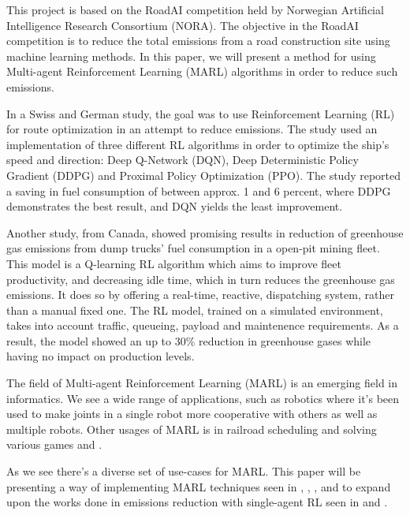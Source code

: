 \documentclass[conference]{IEEEtran}
\begin{document}
	This project is based on the RoadAI competition held by Norwegian Artificial Intelligence Research
	Consortium (NORA). \cite{noraRoadAIReducing} The objective in the RoadAI competition is to reduce the
	total \coo{} emissions from a road construction site using machine learning methods. In this paper, we will
	present a method for using Multi-agent Reinforcement Learning (MARL) algorithms in order to reduce such
	emissions.

	In a Swiss and German study, the goal was to use Reinforcement Learning (RL) for route optimization in
	an attempt to reduce \coo{} emissions. \cite{MORADI2022111882} The study used an implementation of three
	different RL algorithms in order to optimize the ship's speed and direction: Deep Q-Network (DQN),
	Deep Deterministic Policy Gradient (DDPG) and Proximal Policy Optimization (PPO). The study reported a
	saving in fuel consumption of between approx. 1 and 6 percent, where DDPG demonstrates the best result,
	and DQN yields the least improvement.

	Another study, from Canada, \cite{HUO2023106664} showed promising results in reduction of greenhouse gas
	emissions
	from dump trucks' fuel consumption in a open-pit mining fleet. This model is a Q-learning RL algorithm
	which aims to improve fleet productivity, and decreasing idle time, which in turn reduces the greenhouse
	gas emissions. It does so by offering a real-time, reactive,  dispatching system, rather than a manual
	fixed one. The RL model, trained on a simulated environment, takes into account traffic, queueing,
	payload and maintenence requirements. As a result, the model showed an up to 30\% reduction in greenhouse
	gases while having no impact on production levels.

	The field of Multi-agent Reinforcement Learning (MARL) is an emerging field in informatics. We see a wide
	range of applications, such as robotics where it's been used to make joints in a single robot more
	cooperative with others \cite{Perrusquia_Yu_Li_2020} as well as multiple robots. \cite{Wang2022}
	Other usages of MARL is in railroad scheduling \cite{laurent2021flatland} and solving various games
	\cite{ellis2022smacv2} and \cite{yu2022surprising}.

	As we see there's a diverse set of use-cases for MARL. This paper will be presenting a way of implementing
	MARL techniques seen in \cite{Perrusquia_Yu_Li_2020}, \cite{Wang2022}, \cite{laurent2021flatland},
	\cite{ellis2022smacv2} and \cite{yu2022surprising} to expand upon the works done in emissions reduction
	with single-agent RL seen in \cite{HUO2023106664} and \cite{MORADI2022111882}.
\end{document}
